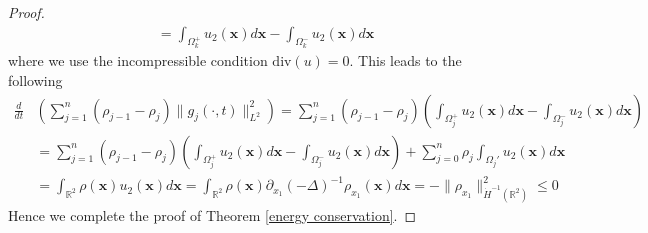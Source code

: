 \documentclass[11pt]{article}
\newcommand{\Om}{\Omega}
\theoremstyle{definition}
\numberwithin{equation}{section}
\begin{document}
\begin{proof}
\begin{align}
        &=\int_{\Om_k^+}u_2(\textbf{x})d\textbf{x}-\int_{\Om_k^-}u_2(\textbf{x})d\textbf{x}
\end{align}
where we use the incompressible condition $\text{div}(u)=0$. This leads to the following
\begin{align}
    \frac{d}{dt}&\left(\sum_{j=1}^n(\rho_{j-1}-\rho_j)\|g_j(\cdot,t)\|_{L^2}^2\right)=\sum_{j=1}^n(\rho_{j-1}-\rho_j)\left(\int_{\Om_j^+}u_2(\textbf{x})d\textbf{x}-\int_{\Om_j^-}u_2(\textbf{x})d\textbf{x}\right)\\
    &=\sum_{j=1}^n(\rho_{j-1}-\rho_j)\left(\int_{\Om_j^+}u_2(\textbf{x})d\textbf{x}-\int_{\Om_j^-}u_2(\textbf{x})d\textbf{x}\right)+\sum_{j=0}^n\rho_j\int_{\Om_j'}u_2(\textbf{x})d\textbf{x}\\
    &=\int_{\mathbb{R}^2}\rho(\textbf{x})u_2(\textbf{x})d\textbf{x}
        =\int_{\mathbb{R}^2}\rho(\textbf{x})\partial_{x_1}(-\Delta)^{-1}\rho_{x_1}(\textbf{x})d\textbf{x}=-\|\rho_{x_1}\|_{\dot{H}^{-1}(\mathbb{R}^2)}^2 \leq0
\end{align}
Hence we complete the proof of Theorem \ref{energy conservation}.
 \end{proof}
\end{document}
